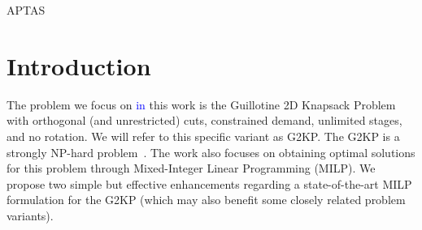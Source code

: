 \documentclass[ppgc,tese,english,formais,babel]{iiufrgs}
\newif\iffinalversion
\newcommand{\newtext}[1]{\iffinalversion%
#1%
\else%
\textcolor{blue}{#1}%
\fi%
}
\begin{document}

\listoftables

\begin{listofabbrv}{APTAS}

\end{listofabbrv}


\tableofcontents


\chapter{Introduction}

The problem we focus on \newtext{in} this work is the Guillotine 2D Knapsack Problem with orthogonal (and unrestricted) cuts, constrained demand, unlimited stages, and no rotation.
We will refer to this specific variant as G2KP.
The G2KP is a strongly NP-hard problem~\citep{russo:2020}.
The work also focuses on obtaining optimal solutions for this problem through Mixed-Integer Linear Programming (MILP).
We propose two simple but effective enhancements regarding a state-of-the-art MILP formulation for the G2KP (which may also benefit some closely related problem variants).
\end{document}

